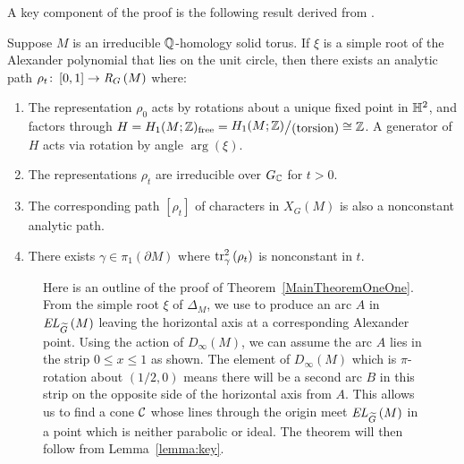 \documentclass[tikz, sepfignums, defaultenums]{nmd/article}
\newcommand{\RG}[1]{\mathit{R}_{G}\left(#1\right)}
\newcommand{\XG}[1]{\mathit{X}_{G}\left(#1\right)}
\newcommand{\GC}{G_\C}
\newcommand{\TEL}[1]{\mathit{EL}_\Gtil\left(#1\right)}
\newcommand{\SymTEL}[1]{D_\infty\left(#1\right)}
\newcommand{\Honefree}{H_1(M; \Z)_{\mathrm{free}}}
\newcommand{\Honefreedef}{%
\rightquom{H_1(M; \Z)}{(\mathrm{torsion})}{1pt}{\big}}
\begin{document}
A key component of the proof is the following result derived from
\cite{HeusenerPorti2005}.  

\begin{lemma}%
  \label{lem:abeliandeforms}
  Suppose $M$ is an irreducible ${\mathbb Q}$-homology solid torus. If $\xi$ is a
  simple root of the Alexander polynomial that lies on the unit
  circle, then there exists an analytic path
  $\rho_t \maps [0, 1] \to \RG{M}$ where:
  \begin{enumerate}
  \item \label{item:character}
    The representation $\rho_0$ acts by rotations about a unique
    fixed point in ${\mathbb{H}}^2$, and factors through
    $H = \Honefree = \Honefreedef \cong \Z$.  A
    generator of $H$ acts via rotation by angle $\arg(\xi)$.

  \item \label{item:irreducible}
    The representations $\rho_t$ are irreducible over $\GC$ for
    $t > 0$.

  \item \label{item:charvaries}
    The corresponding path $[\rho_t]$ of characters in $\XG{M}$ is also
    a nonconstant analytic path.  
    
  \item \label{item:tracevaries} There exists
    $\gamma \in \pi_1(\partial M)$ where
    $\operatorname{tr}^2_\gamma\left(\rho_t\right)$ is nonconstant in $t$.
  \end{enumerate}
\end{lemma}

\begin{figure}
  \begin{center}
    
  \end{center}

  \vspace{-0.2cm}

  \caption{Here is an outline of the proof of
    Theorem~\ref{MainTheoremOneOne}.  From the simple root $\xi$ of
    $\Delta_M$, we use \cite{HeusenerPorti2005} to produce an arc
    $A$ in $\TEL{M}$ leaving the horizontal axis at a
    corresponding Alexander point. Using the action of $\SymTEL{M}$,
    we can assume the arc $A$ lies in the strip
    $0 \leq x \leq 1$ as shown.  The element of $\SymTEL{M}$ which
    is $\pi$-rotation about $(1/2, 0)$ means there will be a second
    arc $B$ in this strip on the opposite side of the
    horizontal axis from $A$.  This allows us to find a cone ${\mathcal C}$
    whose lines through the origin meet $\TEL{M}$ in a
    point which is neither parabolic or ideal.  The theorem will then
    follow from Lemma~\ref{lemma:key}.} \label{fig:arcstocone}
\end{figure}
\end{document}
